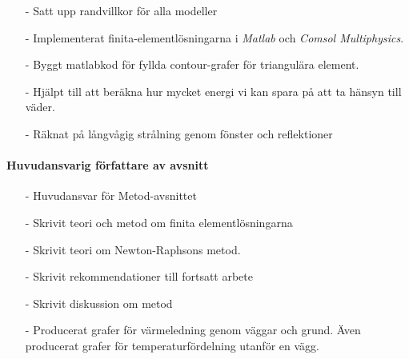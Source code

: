 \documentclass[12pt,a4paper]{article}
\begin{document}
\begin{itemize}

\item[-] Satt upp randvillkor för alla modeller
\item[-] Implementerat finita-elementlösningarna i \emph{Matlab} och \emph{Comsol Multiphysics}.
\item[-] Byggt matlabkod för fyllda contour-grafer för triangulära element.
\item[-] Hjälpt till att beräkna hur mycket energi vi kan spara på att ta hänsyn till väder.
\item[-] Räknat på långvågig strålning genom fönster och reflektioner
\end{itemize}

\paragraph{Huvudansvarig författare av avsnitt}

\begin{itemize}
\item[-] Huvudansvar för Metod-avsnittet
\item[-] Skrivit teori och metod om finita elementlösningarna
\item[-] Skrivit teori om Newton-Raphsons metod.
\item[-] Skrivit rekommendationer till fortsatt arbete
\item[-] Skrivit diskussion om metod
\item[-] Producerat grafer för värmeledning genom väggar och grund. Även producerat
grafer för temperaturfördelning utanför en vägg.
\end{itemize}
\end{document}
